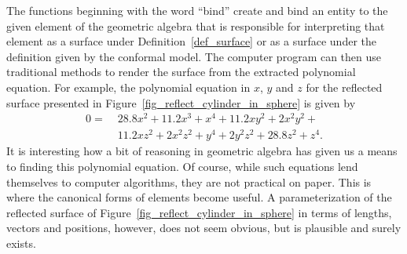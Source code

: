 \documentclass{birkjour}
\theoremstyle{definition}
\theoremstyle{remark}
\numberwithin{equation}{section}
\begin{document}
The functions beginning with the word ``bind'' create and bind an entity to the given
element of the geometric algebra that is responsible for interpreting that element
as a surface under Definition~\ref{def_surface} or as a surface under the definition
given by the conformal model.  The computer program can then
use traditional methods to render the surface from the extracted polynomial equation.
For example, the polynomial equation in $x$, $y$ and $z$ for the reflected surface presented
in Figure~\ref{fig_reflect_cylinder_in_sphere} is given by
\begin{equation}
\begin{split}
0 =\;& 28.8x^{2} + 11.2x^{3} + x^{4} + 11.2xy^{2} + 2x^{2}y^{2} + \\
 & 11.2xz^{2} + 2x^{2}z^{2} + y^{4} + 2y^{2}z^{2} + 28.8z^{2} + z^{4}.
\end{split}
\end{equation}
It is interesting how a bit of reasoning in geometric algebra has given us a means
to finding this polynomial equation.
Of course, while such equations lend themselves to computer algorithms, they
are not practical on paper.  This is where the canonical forms of elements become
useful.  A parameterization of the reflected surface of Figure~\ref{fig_reflect_cylinder_in_sphere} in terms
of lengths, vectors and positions, however, does not seem obvious, but is plausible and surely exists.

\nocite{Dorst07}


\end{document}
